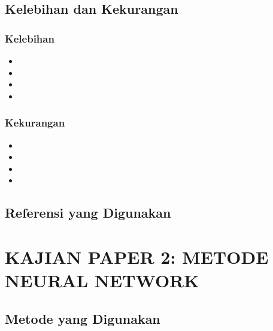 \documentclass[10pt,a4paper]{article}
\begin{document}
\subsection{Kelebihan dan Kekurangan}

\subsubsection{Kelebihan}
\begin{itemize}
    \item %
    \item %
    \item %
    \item %
\end{itemize}

\subsubsection{Kekurangan}
\begin{itemize}
    \item %
    \item %
    \item %
    \item %
\end{itemize}

\subsection{Referensi yang Digunakan}


\section{KAJIAN PAPER 2: METODE NEURAL NETWORK}

\subsection{Metode yang Digunakan}

\end{document}
